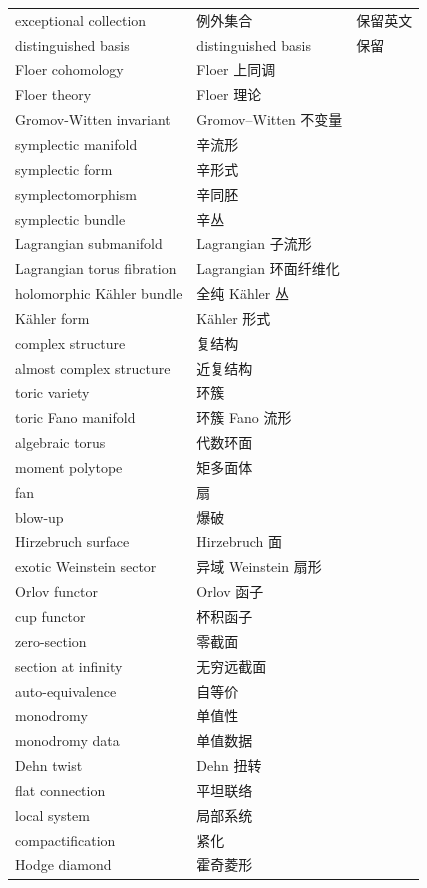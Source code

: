 \documentclass[11pt,a4paper]{article}
\theoremstyle{cnth}
\begin{document}
{\begin{longtable}{p{5.0cm}p{5.6cm}p{3.6cm}}
exceptional collection & 例外集合 & 保留英文 \\
distinguished basis & distinguished basis & 保留 \\
Floer cohomology & Floer 上同调 &  \\
Floer theory & Floer 理论 &  \\
Gromov-Witten invariant & Gromov–Witten 不变量 &  \\
symplectic manifold & 辛流形 &  \\
symplectic form & 辛形式 &  \\
symplectomorphism & 辛同胚 &  \\
symplectic bundle & 辛丛 &  \\
Lagrangian submanifold & Lagrangian 子流形 &  \\
Lagrangian torus fibration & Lagrangian 环面纤维化 &  \\
holomorphic Kähler bundle & 全纯 Kähler 丛 &  \\
Kähler form & Kähler 形式 &  \\
complex structure & 复结构 &  \\
almost complex structure & 近复结构 &  \\
toric variety & 环簇 &  \\
toric Fano manifold & 环簇 Fano 流形 &  \\
algebraic torus & 代数环面 &  \\
moment polytope & 矩多面体 &  \\
fan & 扇 &  \\
blow-up & 爆破 &  \\
Hirzebruch surface & Hirzebruch 面 &  \\
exotic Weinstein sector & 异域 Weinstein 扇形 &  \\
Orlov functor & Orlov 函子 &  \\
cup functor & 杯积函子 &  \\
zero-section & 零截面 &  \\
section at infinity & 无穷远截面 &  \\
auto-equivalence & 自等价 &  \\
monodromy & 单值性 &  \\
monodromy data & 单值数据 &  \\
Dehn twist & Dehn 扭转 &  \\
flat connection & 平坦联络 &  \\
local system & 局部系统 &  \\
compactification & 紧化 &  \\
Hodge diamond & 霍奇菱形 &  \\

\end{longtable}}
\end{document}
